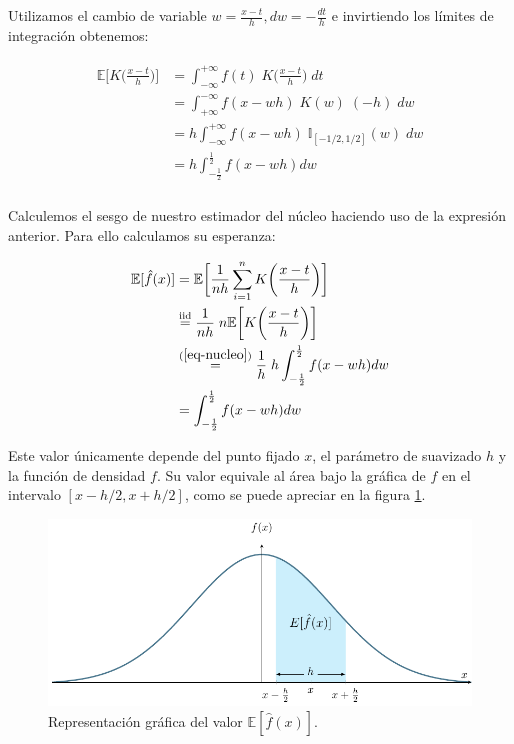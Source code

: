 \documentclass[a4paper]{article}
\newcommand{\E}{\mathbb{E}}
\newcommand{\I}{\mathbb{I}}
\begin{document}
Utilizamos el cambio de variable $w = \frac{x-t}{h}, dw = -\frac{dt}{h}$ e invirtiendo los límites de integración obtenemos:

\begin{align}
	\label{eq-nucleo}
	\begin{split}
		\E \bigg[ K\bigg(\frac{x - t}{h}\bigg) \bigg] & = \int_{-\infty}^{+\infty} f(t) \; K\bigg(\frac{x - t}{h}\bigg) \; dt \\
		& = \int_{+\infty}^{-\infty} f(x - wh) \; K(w) \; (-h) \; dw \\
		& = h \int_{-\infty}^{+\infty} f(x - wh) \; \I_{[-1/2,1/2]}(w) \; dw \\
		& = h \int_{-\frac{1}{2}}^{\frac{1}{2}} f(x - wh) dw \\
	\end{split}
\end{align}

Calculemos el sesgo de nuestro estimador del núcleo haciendo uso de la expresión anterior. Para ello calculamos su esperanza:

\begin{align*}
	\E [ \hat f(x)] & = \E \bigg[ \frac{1}{nh} \sum_{i=1}^n K\bigg(\frac{x - t}{h}\bigg) \bigg] \\
	& \stackrel{\text{iid}}{=} \frac{1}{nh} \; n \E \bigg[ K\bigg(\frac{x - t}{h}\bigg) \bigg] \\
	& \stackrel{(\ref{eq-nucleo})}{=} \frac{1}{h} \; h \int_{-\frac{1}{2}}^{\frac{1}{2}} f(x - wh) dw \\
	& = \int_{-\frac{1}{2}}^{\frac{1}{2}} f(x - wh) dw \\
\end{align*}

Este valor únicamente depende del punto fijado $x$, el parámetro de suavizado $h$ y la función de densidad $f$. Su valor equivale al área bajo la gráfica de $f$ en el intervalo $[x - h/2, x + h/2]$, como se puede apreciar en la figura \ref{fig-sesgo}. \\

\begin{figure}[H]
	\centering
	\includegraphics[scale=0.9]{sesgo}
	\caption{Representación gráfica del valor $\E [\hat f(x)]$.}
	\label{fig-sesgo}
\end{figure}
\end{document}
